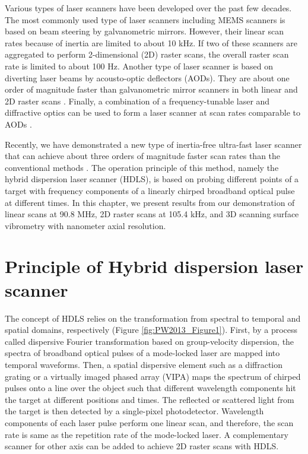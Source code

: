 Various types of laser scanners have been developed over the past few decades. The most commonly used type of laser scanners including MEMS scanners \cite{conant2002micromachined} is based on beam steering by galvanometric mirrors. However, their linear scan rates because of inertia are limited to about 10 kHz. If two of these scanners are aggregated to perform 2-dimensional (2D) raster scans, the overall raster scan rate is limited to about 100 Hz. Another type of laser scanner is based on diverting laser beams by acousto-optic deflectors (AODs). They are about one order of magnitude faster than galvanometric mirror scanners in both linear and 2D raster scans \cite{marshall2011handbook,pape1994design}. Finally, a combination of a frequency-tunable laser and diffractive optics can be used to form a laser scanner at scan rates comparable to AODs \cite{yaqoob2004passive,boudoux2005rapid}.

Recently, we have demonstrated a new type of inertia-free ultra-fast laser scanner that can achieve about three orders of magnitude faster scan rates than the conventional methods \cite{goda2012hybrid}. The operation principle of this method, namely the hybrid dispersion laser scanner (HDLS), is based on probing different points of a target with frequency components of a linearly chirped broadband optical pulse at different times. In this chapter, we present results from our demonstration of linear scans at 90.8 MHz, 2D raster scans at 105.4 kHz, and 3D scanning surface vibrometry with nanometer axial resolution.

\section{Principle of Hybrid dispersion laser scanner}

The concept of HDLS relies on the transformation from spectral to temporal and spatial domains, respectively (Figure \ref{fig:PW2013_Figure1}). First, by a process called dispersive Fourier transformation \cite{kelkar1999time,chou2007femtosecond,goda2009theory,goda2009serial,goda2008amplified} based on group-velocity dispersion, the spectra of broadband optical pulses of a mode-locked laser are mapped into temporal waveforms. Then, a spatial dispersive element such as a diffraction grating or a virtually imaged phased array (VIPA) maps the spectrum of chirped pulses onto a line over the object such that different wavelength components hit the target at different positions and times. The reflected or scattered light from the target is then detected by a single-pixel photodetector. Wavelength components of each laser pulse perform one linear scan, and therefore, the scan rate is same as the repetition rate of the mode-locked laser. A complementary scanner for other axis can be added to achieve 2D raster scans with HDLS.

